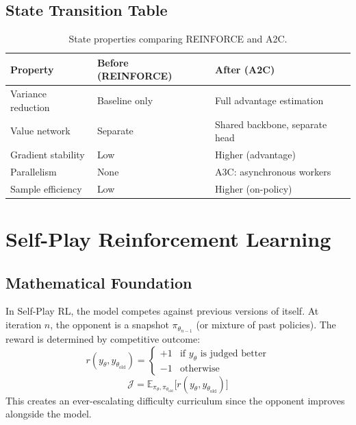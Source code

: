 \subsection{State Transition Table}
\begin{table}[h]\centering
\begin{tabular}{lll}\toprule
\textbf{Property} & \textbf{Before (REINFORCE)} & \textbf{After (A2C)}\\\midrule
Variance reduction & Baseline only & Full advantage estimation\\
Value network & Separate & Shared backbone, separate head\\
Gradient stability & Low & Higher (advantage)\\
Parallelism & None & A3C: asynchronous workers\\
Sample efficiency & Low & Higher (on-policy)\\\bottomrule
\end{tabular}
\caption{State properties comparing REINFORCE and A2C.}
\end{table}

\newpage
\section{Self-Play Reinforcement Learning}

\subsection{Mathematical Foundation}
In Self-Play RL, the model competes against previous versions of itself. At iteration $n$, the opponent is a snapshot $\pi_{\theta_{n-1}}$ (or mixture of past policies). The reward is determined by competitive outcome:
\begin{equation}
  r(y_{\theta}, y_{\theta_{\text{old}}}) = \begin{cases} +1 & \text{if } y_{\theta} \text{ is judged better} \\ -1 & \text{otherwise} \end{cases}
\end{equation}
\begin{equation}
  \mathcal{J} = \mathbb{E}_{\pi_\theta, \pi_{\theta_{\text{old}}}}\bigl[r(y_\theta, y_{\theta_{\text{old}}})\bigr]
\end{equation}
This creates an ever-escalating difficulty curriculum since the opponent improves alongside the model.

